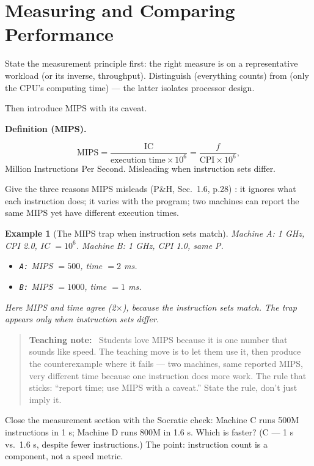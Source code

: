 \documentclass[11pt]{article}
\newtheorem{example}{Example}[section]
\newenvironment{definitionbox}[1]{%
  \par\noindent\textbf{Definition (#1).}\ \itshape
}{\par\vspace{0.3em}}
\newenvironment{teachingaside}{\begin{quote}\small\color{primary-gold}\textbf{Teaching note:}\ }{\end{quote}}
\begin{document}
\section{Measuring and Comparing Performance}

State the measurement principle first: the right measure is  on a representative workload (or its inverse, throughput). Distinguish  (everything counts) from  (only the CPU's computing time) --- the latter isolates processor design.

Then introduce MIPS with its caveat.

\begin{definitionbox}{MIPS}
\[
  \text{MIPS} = \frac{\text{IC}}{\text{execution time} \times 10^6} = \frac{f}{\text{CPI} \times 10^6},
\]
Million Instructions Per Second. Misleading when instruction sets differ.
\end{definitionbox}

Give the three reasons MIPS misleads (P\&H, Sec.~1.6, p.28) \cite{PattersonHennessy2017_computer_organization_design}: it ignores what each instruction does; it varies with the program; two machines can report the same MIPS yet have different execution times.

\begin{example}[The MIPS trap when instruction sets match]
Machine A: 1 GHz, CPI 2.0, IC $= 10^6$. Machine B: 1 GHz, CPI 1.0, same P.
\begin{itemize}
  \item \texttt{A:} MIPS $= 500$, time $= 2$ ms.
  \item \texttt{B:} MIPS $= 1000$, time $= 1$ ms.
\end{itemize}
Here MIPS and time agree (2$\times$), because the instruction sets match. The trap appears only when instruction sets differ.
\end{example}

\begin{teachingaside}
Students love MIPS because it is one number that sounds like speed. The teaching move is to let them use it, then produce the counterexample where it fails --- two machines, same reported MIPS, very different time because one instruction does more work. The rule that sticks: ``report time; use MIPS with a caveat.'' State the rule, don't just imply it.
\end{teachingaside}

Close the measurement section with the Socratic check: Machine C runs 500M instructions in 1 s; Machine D runs 800M in 1.6 s. Which is faster? (C --- 1 s vs.\ 1.6 s, despite fewer instructions.) The point: instruction count is a component, not a speed metric.
\end{document}
